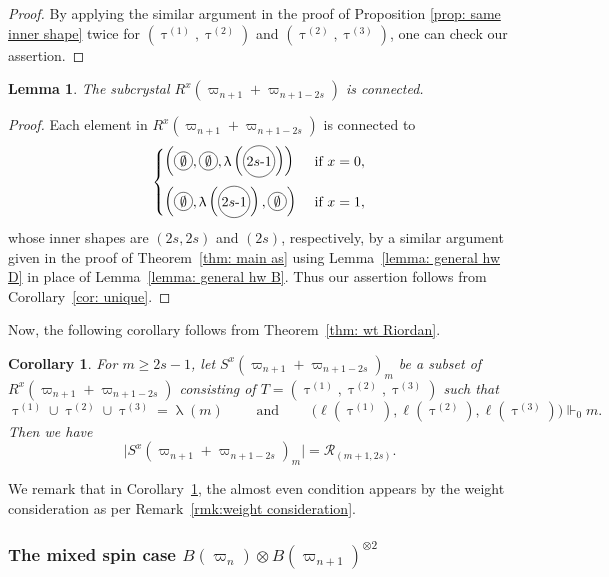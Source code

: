 \documentclass[11pt, leqno]{amsart}
\theoremstyle{plain}
\newtheorem{lemma}[theorem]{Lemma}
\newtheorem{corollary}[theorem]{Corollary}
\theoremstyle{definition}
\numberwithin{equation}{section}
\newcommand{\fw}{\varpi} %
\newcommand{\ntau}[1]{\btau^{(#1)}}
\newcommand{\btau}{\uptau}
\newcommand*\nn[1]{\tikz[baseline=(char.base)]{%
            \node[shape=circle,draw,inner sep=1.3pt] (char) {#1};}}
\newcommand{\Rior}{\mathcal{R}} %
\begin{document}
\begin{proof}
By applying the similar argument in the proof of Proposition \ref{prop: same inner shape} twice for $(\ntau{1},\ntau{2})$ and $(\ntau{2},\ntau{3})$, one can check our assertion.
\end{proof}

\begin{lemma}
\label{lem: connected Rd}
The subcrystal $R^x(\fw_{n+1}+\fw_{n+1-2s})$ is connected.
\end{lemma}

\begin{proof}
Each element in $R^x(\fw_{n+1}+\fw_{n+1-2s})$ is connected to
\[
\begin{cases}
\left( \nn{$\emptyset$},  \nn{$\emptyset$}, \uplambda\left(\nn{$2s$-$1$}\right) \right)   & \text{ if } x=0, \\[10pt]
\left(\nn{$\emptyset$},   \uplambda\left(\nn{$2s$-$1$}\right), \nn{$\emptyset$} \right)   & \text{ if } x=1,
\end{cases}  \]
whose inner shapes are $(2s,2s)$ and $(2s)$, respectively, by a similar argument given in the proof of Theorem~\ref{thm: main as} using Lemma~\ref{lemma: general hw D} in place of Lemma~\ref{lemma: general hw B}.
Thus our assertion follows from Corollary~\ref{cor: unique}.
\end{proof}

Now, the following corollary follows from Theorem~\ref{thm: wt Riordan}.

\begin{corollary}
\label{cor:riordan_triangle_set}
For $m \ge 2s-1$,
let $S^x(\fw_{n+1}+\fw_{n+1-2s})_m$ be a subset of $R^x(\fw_{n+1}+\fw_{n+1-2s})$ consisting of $T=(\ntau{1},\ntau{2},\ntau{3})$ such that
\[
\ntau{1}\cup \ntau{2} \cup \ntau{3} = \uplambda(m)   \qquad \text{ and } \qquad \bigl( \ell(\ntau{1}), \ell(\ntau{2}), \ell(\ntau{3}) \bigr) \Vdash_0 m.
\]
Then we have
\[
\lvert S^x(\fw_{n+1}+\fw_{n+1-2s})_m \rvert = \Rior_{(m+1,2s)}.
\]
\end{corollary}

We remark that in Corollary~\ref{cor:riordan_triangle_set}, the almost even condition appears by the weight consideration as per Remark~\ref{rmk:weight consideration}.

\subsubsection{The mixed spin case $B(\fw_{n}) \otimes B(\fw_{n+1})^{\otimes 2}$}
\end{document}
